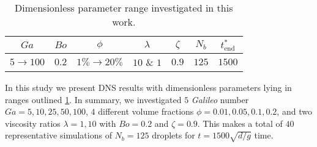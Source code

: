 \begin{table}[h!]
    \centering
    \caption{Dimensionless parameter range investigated in this work.}
    \begin{tabular}{ccccccc}\hline
        $Ga$&$Bo$&$\phi$&$\lambda$&$\zeta$&$N_b$&$t^*_\text{end}$\\ \hline\hline
        $5\rightarrow 100$&$0.2$&$1\% \rightarrow 20\%$&$10$ \& $1$&$0.9$&$125$&$1500$\\ \hline
    \end{tabular}
    \label{tab:simulations}
\end{table}
In this study we present DNS results with dimensionless parameters lying in ranges outlined \ref{tab:simulations}.
In summary, we investigated $5$ \textit{Galileo} number $Ga = 5,10,25,50,100$, $4$ different volume fractions $\phi = 0.01,0.05,0.1,0.2$, and two viscosity ratios $\lambda =1,10$ with $Bo = 0.2$ and $\zeta = 0.9$. 
This makes a total of $40$ representative simulations of $N_b = 125$ droplets for $t= 1500 \sqrt{d/g}$ time. 







